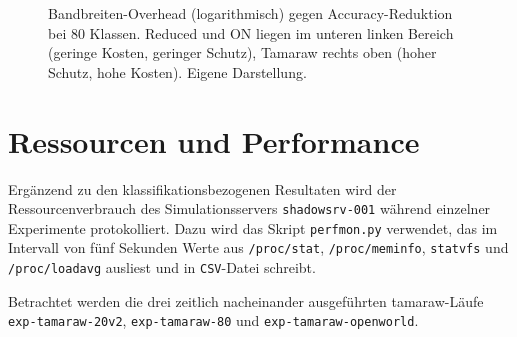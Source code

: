 \begin{figure}[H]
    \centering
    \caption{Bandbreiten-Overhead (logarithmisch) gegen Accuracy-Reduktion bei 80 Klassen. Reduced und ON liegen im unteren linken Bereich (geringe Kosten, geringer Schutz), Tamaraw rechts oben (hoher Schutz, hohe Kosten). Eigene Darstellung.}
    \label{fig:eval_defense_tradeoff}
\end{figure}

\section{Ressourcen und Performance}
\label{sec:eval_performance}

Ergänzend zu den klassifikationsbezogenen Resultaten wird der Ressourcenverbrauch des Simulationsservers \texttt{shadowsrv-001} während einzelner Experimente protokolliert.
Dazu wird das Skript \texttt{perfmon.py} verwendet, das im Intervall von fünf Sekunden Werte aus \texttt{/proc/stat}, \texttt{/proc/meminfo}, \texttt{statvfs} und \texttt{/proc/loadavg} ausliest und in \texttt{CSV}-Datei schreibt.

Betrachtet werden die drei zeitlich nacheinander ausgeführten \gls{tamaraw}-Läufe \texttt{exp-tamaraw-20v2}, \texttt{exp-tamaraw-80} und \texttt{exp-tamaraw-openworld}.

